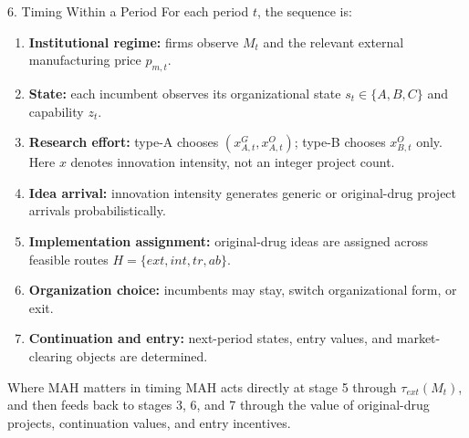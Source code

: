 \documentclass[aspectratio=169,11pt]{beamer}
\begin{document}
\begin{frame}{6. Timing Within a Period}
\small
For each period \(t\), the sequence is:

\vspace{0.1cm}
\begin{enumerate}
\item \textbf{Institutional regime:} firms observe \(M_t\) and the relevant external manufacturing price \(p_{m,t}\).
\item \textbf{State:} each incumbent observes its organizational state \(s_t\in\{A,B,C\}\) and capability \(z_t\).
\item \textbf{Research effort:} type-A chooses \((x_{A,t}^G,x_{A,t}^O)\); type-B chooses \(x_{B,t}^O\) only. Here \(x\) denotes innovation intensity, not an integer project count.
\item \textbf{Idea arrival:} innovation intensity generates generic or original-drug project arrivals probabilistically.
\item \textbf{Implementation assignment:} original-drug ideas are assigned across feasible routes \(H=\{ext,int,tr,ab\}\).
\item \textbf{Organization choice:} incumbents may stay, switch organizational form, or exit.
\item \textbf{Continuation and entry:} next-period states, entry values, and market-clearing objects are determined.
\end{enumerate}

\vspace{0.05cm}
\begin{block}{Where MAH matters in timing}
MAH acts directly at stage 5 through \(\tau_{ext}(M_t)\), and then feeds back to stages 3, 6, and 7 through the value of original-drug projects, continuation values, and entry incentives.
\end{block}
\end{frame}
\end{document}
